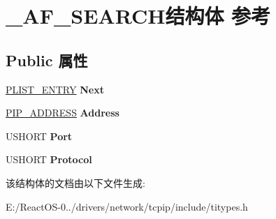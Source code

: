 \hypertarget{struct___a_f___s_e_a_r_c_h}{}\section{\+\_\+\+A\+F\+\_\+\+S\+E\+A\+R\+C\+H结构体 参考}
\label{struct___a_f___s_e_a_r_c_h}
\subsection*{Public 属性}
\begin{DoxyCompactItemize}
\item 
\mbox{\label{struct___a_f___s_e_a_r_c_h_a0d510d4dc5b1e49e745ec7303c1d03ac}} 
\hyperlink{struct___l_i_s_t___e_n_t_r_y}{P\+L\+I\+S\+T\+\_\+\+E\+N\+T\+RY} {\bfseries Next}
\item 
\mbox{\label{struct___a_f___s_e_a_r_c_h_a916746848dc98aee4d213e5e34c0f933}} 
\hyperlink{struct_i_p___a_d_d_r_e_s_s}{P\+I\+P\+\_\+\+A\+D\+D\+R\+E\+SS} {\bfseries Address}
\item 
\mbox{\label{struct___a_f___s_e_a_r_c_h_a6973a34962f99c07b7a0ad0dc0435a66}} 
U\+S\+H\+O\+RT {\bfseries Port}
\item 
\mbox{\label{struct___a_f___s_e_a_r_c_h_a99fe45d841bb5d1e2c88bfa7de6221a6}} 
U\+S\+H\+O\+RT {\bfseries Protocol}
\end{DoxyCompactItemize}


该结构体的文档由以下文件生成\+:\begin{DoxyCompactItemize}
\item 
E\+:/\+React\+O\+S-\/0../drivers/network/tcpip/include/titypes.\+h\end{DoxyCompactItemize}
